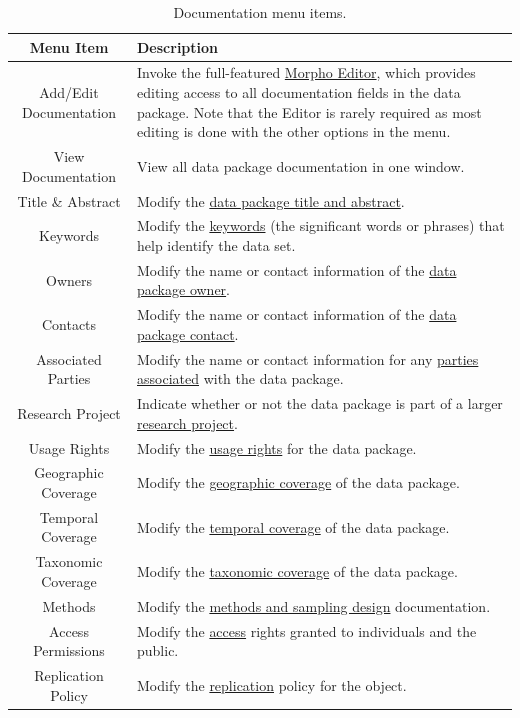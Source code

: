 \begin{table}[htbp]
  \centering
  \begin{tabular}{|c|m{}|}
  \hline
  \textbf{Menu Item} & \textbf{Description} \\
  \hline
  Add/Edit Documentation &
    Invoke the full-featured \hyperref[sec:edit-doc-tree]{Morpho
    Editor}, which provides editing access to all documentation fields
    in the data package. Note that the Editor is rarely required as most
    editing is done with the other options in the menu. \\
  \hline
  View Documentation &
    View all data package documentation in one window. \\
  \hline
  Title \& Abstract &
    Modify the \hyperref[sec:wizard-dp-title]{data package title and
    abstract}. \\
  \hline
  Keywords &
    Modify the \hyperref[sec:wizard-dp-keywords]{keywords} (the significant
    words or phrases) that help identify the data set. \\
  \hline
  Owners &
    Modify the name or contact information of the
    \hyperref[sec:wizard-dp-people]{data package owner}. \\
  \hline
  Contacts &
    Modify the name or contact information of the
    \hyperref[sec:wizard-dp-people]{data package contact}. \\
  \hline
  Associated Parties &
    Modify the name or contact information for any
    \hyperref[sec:wizard-dp-people]{parties associated} with the data
    package. \\
  \hline
  Research Project &
    Indicate whether or not the data package is part of a larger
    \hyperref[sec:wizard-dp-project]{research project}. \\
  \hline
  Usage Rights &
    Modify the \hyperref[sec:wizard-dp-usage]{usage rights} for the data
    package. \\
  \hline
  Geographic Coverage &
    Modify the \hyperref[sec:wizard-dp-coverage]{geographic coverage} of
    the data package. \\
  \hline
  Temporal Coverage &
    Modify the \hyperref[sec:wizard-dp-coverage]{temporal coverage} of
    the data package. \\
  \hline
  Taxonomic Coverage &
    Modify the \hyperref[sec:wizard-dp-coverage]{taxonomic coverage} of
    the data package. \\
  \hline
  Methods &
    Modify the \hyperref[sec:wizard-dp-methods]{methods and sampling
    design} documentation. \\
  \hline
  Access Permissions &
    Modify the \hyperref[sec:wizard-dp-access]{access} rights granted
    to individuals and the public. \\
  \hline
  Replication Policy &
    Modify the \hyperref[sec:wizard-dp-replication]{replication} policy
    for the object. \\  
  \hline
  \end{tabular}
  \caption{Documentation menu items.}
  \label{tab:edit-doc-items}
\end{table}


